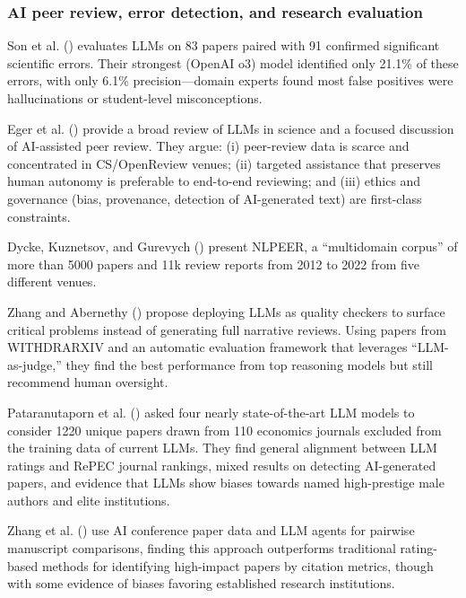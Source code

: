 \documentclass[
  11pt,
  letterpaper,
]{article}
\begin{document}
\subsubsection{AI peer review, error detection, and research
evaluation}\label{ai-peer-review-error-detection-and-research-evaluation}

Son et al. () evaluates LLMs on 83
papers paired with 91 confirmed significant scientific errors. Their
strongest (OpenAI o3) model identified only 21.1\% of these errors, with
only 6.1\% precision---domain experts found most false positives were
hallucinations or student-level misconceptions.

Eger et al. () provide a broad review of
LLMs in science and a focused discussion of AI-assisted peer review.
They argue: (i) peer-review data is scarce and concentrated in
CS/OpenReview venues; (ii) targeted assistance that preserves human
autonomy is preferable to end-to-end reviewing; and (iii) ethics and
governance (bias, provenance, detection of AI-generated text) are
first-class constraints.

Dycke, Kuznetsov, and Gurevych () present
NLPEER, a ``multidomain corpus'' of more than 5000 papers and 11k review
reports from 2012 to 2022 from five different venues.

Zhang and Abernethy () propose deploying
LLMs as quality checkers to surface critical problems instead of
generating full narrative reviews. Using papers from WITHDRARXIV and an
automatic evaluation framework that leverages ``LLM-as-judge,'' they
find the best performance from top reasoning models but still recommend
human oversight.

Pataranutaporn et al. () asked
four nearly state-of-the-art LLM models to consider 1220 unique papers
drawn from 110 economics journals excluded from the training data of
current LLMs. They find general alignment between LLM ratings and RePEC
journal rankings, mixed results on detecting AI-generated papers, and
evidence that LLMs show biases towards named high-prestige male authors
and elite institutions.

Zhang et al. () use AI
conference paper data and LLM agents for pairwise manuscript
comparisons, finding this approach outperforms traditional rating-based
methods for identifying high-impact papers by citation metrics, though
with some evidence of biases favoring established research institutions.
\end{document}
